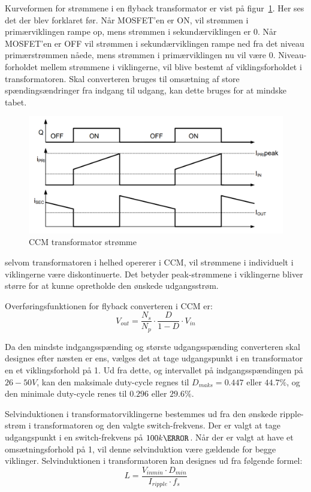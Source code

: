 Kurveformen for strømmene i en flyback transformator er vist på figur~\ref{fig:flyabck_ideal_currents}. Her ses det der blev forklaret før. Når MOSFET'en er ON, vil strømmen i primærviklingen rampe op, mens strømmen i sekundærviklingen er 0. Når MOSFET'en er OFF vil strømmen i sekundærviklingen rampe ned fra det niveau primærstrømmen nåede, mens strømmen i primærviklingen nu vil være 0. Niveau-forholdet mellem strømmene i viklingerne, vil blive bestemt af viklingsforholdet i transformatoren. Skal converteren bruges til omsætning af store spændingsændringer fra indgang til udgang, kan dette bruges for at mindske tabet. 

\begin{figure}[H]
	\centering
	\includegraphics[width=0.7\linewidth]{../Dokumentation/tex/1iteration/billeder/CCM_transformer_current.png}
	\caption{CCM transformator strømme}
	\label{fig:flyabck_ideal_currents}
\end{figure}

selvom transformatoren i helhed opererer i CCM, vil strømmene i individuelt i viklingerne være diskontinuerte. Det betyder peak-strømmene i viklingerne bliver større for at kunne opretholde den ønskede udgangsstrøm. 

\noindent Overføringsfunktionen for flyback converteren i CCM er\cite{SMPS-topologies2}:
\begin{equation*}
	V_{out} = \frac{N_s}{N_p} \cdot \frac{D}{1-D} \cdot V_{in}
\end{equation*}

Da den mindste indgangsspænding og største udgangsspænding converteren skal designes efter næsten er ens, vælges det at tage udgangspunkt i en transformator en et viklingsforhold på 1. Ud fra dette, og intervallet på indgangsspændingen på $26-50V$, kan den maksimale duty-cycle regnes til $D_{maks} = 0.447$ eller $44.7\percent$, og den minimale duty-cycle renes til $0.296$ eller $29.6\percent$.  

Selvinduktionen i transformatorviklingerne bestemmes ud fra den ønskede ripple-strøm i transformatoren og den valgte switch-frekvens. Der er valgt at tage udgangspunkt i en switch-frekvens på $100k\hertz$. Når der er valgt at have et omsætningsforhold på 1, vil denne selvinduktion være gældende for begge viklinger. Selvinduktionen i transformatoren kan designes ud fra følgende formel\cite{flyback-formler}:
\begin{equation*}
	L = \frac{V_{inmin} \cdot D_{min}}{I_{ripple} \cdot f_s}
\end{equation*}

